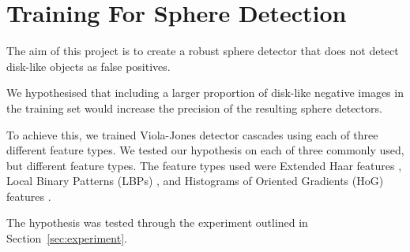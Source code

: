 \documentclass{llncs}
\begin{document}
	\section{Training For Sphere Detection} {

		The aim of this project is to create a robust sphere detector that does not detect disk-like objects as false positives.

		We hypothesised that including a larger proportion of disk-like negative images in the training set would increase the precision of the resulting sphere detectors.

		To achieve this, we trained Viola-Jones detector cascades \citep{viola2001rapid}
		using each of three different feature types.
		We tested our hypothesis on each of three commonly used, but different feature types.
		The feature types used were
		Extended Haar features \citep{Lienhart2002extended},
		Local Binary Patterns (LBPs) \citep{liao2007learning}, and
		Histograms of Oriented Gradients (HoG) features \citep{dalal2005histograms}.

		The hypothesis was tested through the experiment outlined in Section~\ref{sec:experiment}.
	}
\end{document}
